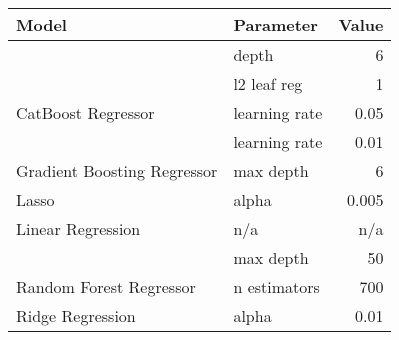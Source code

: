 
\begin{tabular}[t]{llr}
\toprule
\multicolumn{1}{l}{Model} & \multicolumn{1}{l}{Parameter} & \multicolumn{1}{l}{Value}\\
\midrule
 & depth & 6\\

 & l2 leaf reg & 1\\

\multirow[t]{-3}{*}{\raggedright\arraybackslash CatBoost Regressor} & learning rate & 0.05\\
\cmidrule(lr){1-3}

 & learning rate & 0.01\\

\multirow[t]{-2}{*}{\raggedright\arraybackslash Gradient Boosting Regressor} & max depth & 6\\
\cmidrule(lr){1-3}

Lasso & alpha & 0.005\\
\cmidrule(lr){1-3}

Linear Regression & n/a & n/a\\
\cmidrule(lr){1-3}

 & max depth & 50\\

\multirow[t]{-2}{*}{\raggedright\arraybackslash Random Forest Regressor} & n estimators & 700\\
\cmidrule(lr){1-3}

Ridge Regression & alpha & 0.01\\
\bottomrule
\end{tabular}
